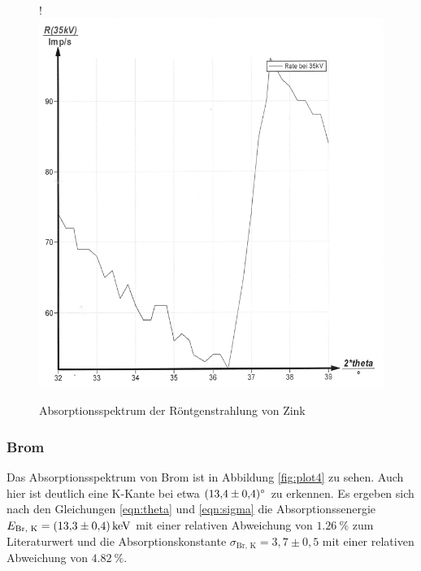 \begin{figure}[H]!
  \centering
  \includegraphics[scale=0.3]{content/bild7.png}
  \caption{Absorptionsspektrum der Röntgenstrahlung von Zink}
  \label{fig:plot3}
\end{figure}

\subsubsection{Brom}

Das Absorptionsspektrum von Brom ist in Abbildung \ref{fig:plot4} zu sehen.
Auch hier ist deutlich eine K-Kante bei etwa $\SI{13.4 +- 0.4}{\degree}$ zu erkennen.
Es ergeben sich nach den Gleichungen \eqref{eqn:theta} und \eqref{eqn:sigma}
die Absorptionssenergie $ E_\text{Br, K} = \SI{13.3 +- 0.4}{\kilo\eV}$ mit einer 
relativen Abweichung von $\SI{1.26}{\percent}$ zum Literaturwert und die 
Absorptionskonstante $\sigma_\text{Br, K} = 3,7 \pm 0,5$ mit einer relativen
Abweichung von $\SI{4.82}{\percent}$.

